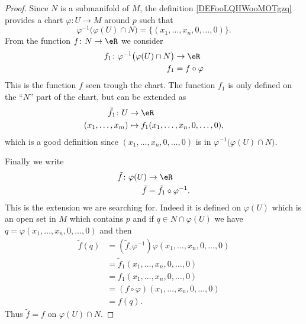 \begin{proof}
    Since \( N\) is a submanifold of \( M\), the definition \ref{DEFooLQHWooMOTgzq} provides a chart \( \varphi\colon U\to M\) around \( p\) such that 
    \begin{equation}
        \varphi^{-1}\big( \varphi(U)\cap N \big)=\{ (x_1,\ldots, x_n,0,\ldots, 0) \}.
    \end{equation}
    From the function \( f\colon N\to \eR\) we consider 
    \begin{equation}
        \begin{aligned}
            f_1\colon \varphi^{-1}\big( \varphi(U)\cap N \big)&\to \eR \\
            f_1&=f\circ\varphi
        \end{aligned}
    \end{equation}
    This is the function \( f\) seen trough the chart. The function \( f_1\) is only defined on the ``\( N\)'' part of the chart, but can be extended as
    \begin{equation}
        \begin{aligned}
            \tilde f_1\colon U&\to \eR \\
            (x_1,\ldots, x_m)&\mapsto f_1(x_1,\ldots, x_n,0,\ldots, 0), 
        \end{aligned}
    \end{equation}
    which is a good definition since \( (x_1,\ldots, x_n,0,\ldots, 0)\) is in \( \varphi^{-1}\big( \varphi(U)\cap N \big)\).

    Finally we write
    \begin{equation}
        \begin{aligned}
            \tilde f\colon \varphi(U)&\to \eR \\
            \tilde f&=\tilde f_1\circ\varphi^{-1}.
        \end{aligned}
    \end{equation}
    This is the extension we are searching for. Indeed it is defined on \( \varphi(U)\) which is an open set in \( M\) which contains \( p\) and if \( q\in N\cap\varphi(U)\) we have \( q=\varphi(x_1,\ldots, x_n,0,\ldots, 0)\) and then
    \begin{subequations}
        \begin{align}
            \tilde f(q)&=(\tilde f_\circ\varphi^{-1})\varphi(x_1,\ldots, x_n,0,\ldots, 0)\\
            &=\tilde f_1(x_1,\ldots, x_n,0,\ldots, 0)\\
            &=f_1(x_1,\ldots, x_n,0,\ldots, 0)\\
            &=(f\circ\varphi)(x_1,\ldots, x_n,0,\ldots, 0)\\
            &=f(q).
        \end{align}
    \end{subequations}
    Thus \( \tilde f=f\) on \( \varphi(U)\cap N\).
\end{proof}

